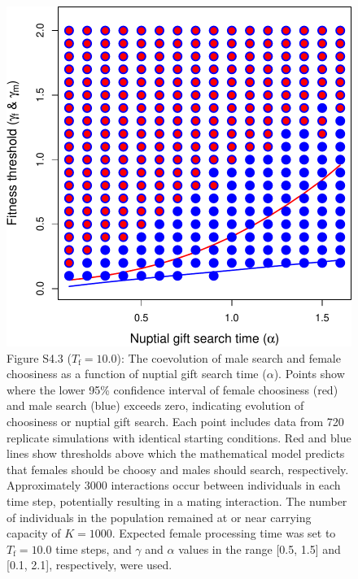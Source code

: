 \documentclass[
]{article}
\begin{document}
\captionsetup{labelformat=default}

\captionsetup{labelformat=empty}

\begin{figure}
\centering
\includegraphics{ms_refs_fixed_files/figure-latex/unnamed-chunk-8-1.pdf}
\caption{Figure S4.3 (\(T_{\mathrm{f}} = 10.0\)): The coevolution of
male search and female choosiness as a function of nuptial gift search
time (\(\alpha\)). Points show where the lower 95\% confidence interval
of female choosiness (red) and male search (blue) exceeds zero,
indicating evolution of choosiness or nuptial gift search. Each point
includes data from 720 replicate simulations with identical starting
conditions. Red and blue lines show thresholds above which the
mathematical model predicts that females should be choosy and males
should search, respectively. Approximately 3000 interactions occur
between individuals in each time step, potentially resulting in a mating
interaction. The number of individuals in the population remained at or
near carrying capacity of \(K = 1000\). Expected female processing time
was set to \(T_{\mathrm{f}}=10.0\) time steps, and \(\gamma\) and
\(\alpha\) values in the range {[}0.5, 1.5{]} and {[}0.1, 2.1{]},
respectively, were used.}
\end{figure}

\captionsetup{labelformat=default}
\end{document}
